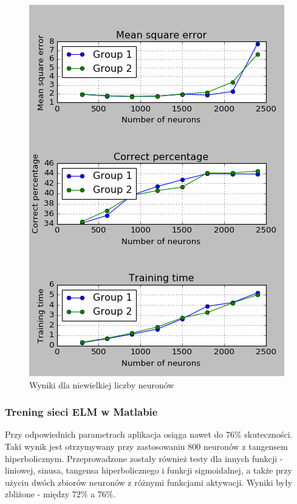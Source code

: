 \documentclass{article}
\begin{document}
\begin{figure}[H]
\centering
\includegraphics[width=\textwidth]{wyniki_forest_python.png}
\caption{Wyniki dla niewielkiej liczby neuronów}
\label{forest_python}
\end{figure}
\subsubsection{Trening sieci ELM w Matlabie}
Przy odpowiednich parametrach aplikacja osiąga nawet do 76\% skuteczności. 
Taki wynik jest otrzymywany przy zastosowaniu 800 neuronów z tangensem hiperbolicznym.
Przeprowadzone zostały również testy dla innych funkcji - liniowej, sinusa, tangensa hiperbolicznego i funkcji sigmoidalnej, a także przy użyciu dwóch zbiorów neuronów z różnymi funkcjami aktywacji.
Wyniki były zbliżone - między 72\% a 76\%.
\end{document}
